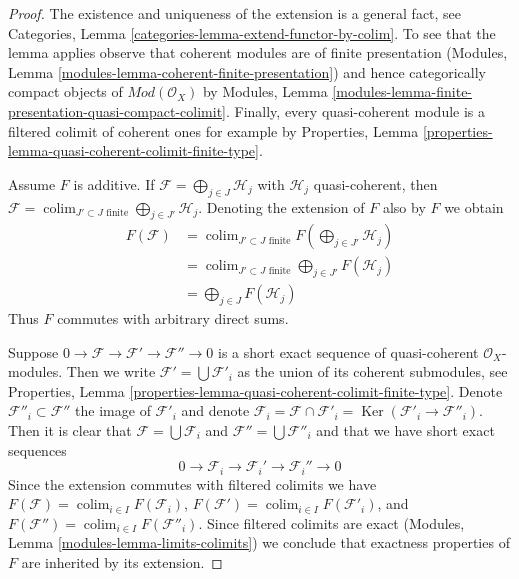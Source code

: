 \documentclass[10pt,a4paper]{amsart}
\theoremstyle{plain}
\theoremstyle{definition}
\theoremstyle{remark}
\numberwithin{equation}{subsection}
\def\colim{\mathop{\mathrm{colim}}\nolimits}
\def\Ker{\mathop{\mathrm{Ker}}}
\begin{document}
\begin{proof}
The existence and uniqueness of the extension is a general fact, see
Categories, Lemma \ref{categories-lemma-extend-functor-by-colim}.
To see that the lemma applies observe that coherent modules
are of finite presentation
(Modules, Lemma \ref{modules-lemma-coherent-finite-presentation}) and hence
categorically compact objects of $\textit{Mod}(\mathcal{O}_X)$ by
Modules, Lemma \ref{modules-lemma-finite-presentation-quasi-compact-colimit}.
Finally, every quasi-coherent module is a filtered colimit
of coherent ones for example by
Properties, Lemma \ref{properties-lemma-quasi-coherent-colimit-finite-type}.

\medskip\noindent
Assume $F$ is additive. If $\mathcal{F} = \bigoplus_{j \in J} \mathcal{H}_j$
with $\mathcal{H}_j$ quasi-coherent, then
$\mathcal{F} = \colim_{J' \subset J\text{ finite}}
\bigoplus_{j \in J'} \mathcal{H}_j$.
Denoting the extension of $F$ also by $F$ we obtain
\begin{align*}
F(\mathcal{F})
& =
\colim_{J' \subset J\text{ finite}}
F(\bigoplus\nolimits_{j \in J'} \mathcal{H}_j) \\
& =
\colim_{J' \subset J\text{ finite}}
\bigoplus\nolimits_{j \in J'} F(\mathcal{H}_j) \\
& =
\bigoplus\nolimits_{j \in J} F(\mathcal{H}_j)
\end{align*}
Thus $F$ commutes with arbitrary direct sums.

\medskip\noindent
Suppose $0 \to \mathcal{F} \to \mathcal{F}' \to \mathcal{F}'' \to 0$
is a short exact sequence of quasi-coherent $\mathcal{O}_X$-modules.
Then we write $\mathcal{F}' = \bigcup \mathcal{F}'_i$ as the
union of its coherent submodules, see
Properties, Lemma \ref{properties-lemma-quasi-coherent-colimit-finite-type}.
Denote $\mathcal{F}''_i \subset \mathcal{F}''$ the image of $\mathcal{F}'_i$
and denote $\mathcal{F}_i = \mathcal{F} \cap \mathcal{F}'_i =
\Ker(\mathcal{F}'_i \to \mathcal{F}''_i)$. Then it is clear that
$\mathcal{F} = \bigcup \mathcal{F}_i$ and
$\mathcal{F}'' = \bigcup \mathcal{F}''_i$
and that we have short exact sequences
$$
0 \to \mathcal{F}_i \to \mathcal{F}_i' \to \mathcal{F}_i'' \to 0
$$
Since the extension commutes with filtered colimits we have
$F(\mathcal{F}) = \colim_{i \in I} F(\mathcal{F}_i)$,
$F(\mathcal{F}') = \colim_{i \in I} F(\mathcal{F}'_i)$, and
$F(\mathcal{F}'') = \colim_{i \in I} F(\mathcal{F}''_i)$.
Since filtered colimits are exact
(Modules, Lemma \ref{modules-lemma-limits-colimits}) we
conclude that exactness properties of $F$ are inherited by
its extension.
\end{proof}
\end{document}
